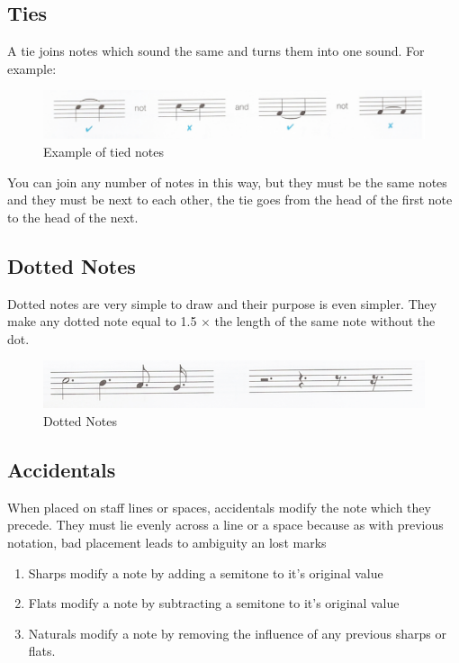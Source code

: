 \subsection* {Ties}

A tie joins notes which sound the same and turns them into one sound. For example:

\begin{figure}[h!]
  \includegraphics[width=\linewidth]{gfx/basic/ties.png}
  \centering
  \caption{Example of tied notes}
  \label{fig:TiedNotes}
\end{figure}

You can join any number of notes in this way, but they must be the same notes and they must be next to each other, the tie goes from the head of the first note to the head of the next.

\subsection*{Dotted Notes}

Dotted notes are very simple to draw and their purpose is even simpler. They make any dotted note equal to 1.5 $\times$ the length of the same note without the dot.

\begin{figure}[h!]
  \includegraphics[width=\linewidth]{gfx/basic/dotted-notes.png}
  \centering
  \caption{Dotted Notes}
  \label{fig:DottedNotes}
\end{figure}

\subsection*{Accidentals}

When placed on staff lines or spaces, accidentals modify the note which they precede. They must lie evenly across a line or a space because as with previous notation, bad placement leads to ambiguity an lost marks

\begin{enumerate}
\item Sharps modify a note by adding a semitone to it's original value
\item Flats modify a note by subtracting a semitone to it's original value
\item Naturals modify a note by removing the influence of any previous sharps or flats.
\end{enumerate}

